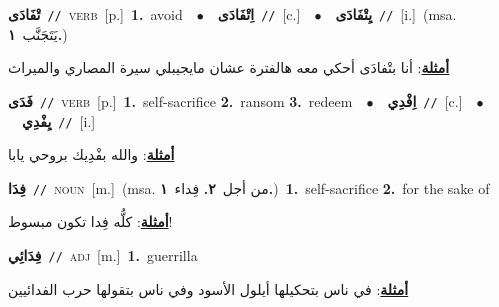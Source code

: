 \documentclass[10pt,a4paper,twoside]{article} %
\begin{document}
\begin{multicols}{2}
{\setlength\topsep{0pt}\textbf{\foreignlanguage{arabic}{تْفَادَى}}\ {\color{gray}\texttt{//}\color{black}}\ \textsc{verb}\ [p.]\ \textbf{1.}~avoid\ \ $\bullet$\ \ \setlength\topsep{0pt}\textbf{\foreignlanguage{arabic}{اِتْفَادَى}}\ {\color{gray}\texttt{//}\color{black}}\ [c.]\ \ $\bullet$\ \ \setlength\topsep{0pt}\textbf{\foreignlanguage{arabic}{يِتْفَادَى}}\ {\color{gray}\texttt{//}\color{black}}\ [i.]\ \color{gray}(msa. \foreignlanguage{arabic}{يَتَجَنَّب}~\foreignlanguage{arabic}{\textbf{١.}})\color{black}\  \begin{flushright}\color{gray}\foreignlanguage{arabic}{\textbf{\underline{\foreignlanguage{arabic}{أمثلة}}}: أنا بتْفادَى أحكي معه هالفترة عشان مايجيبلي سيرة المصاري والميراث}\end{flushright}\color{black}} \vspace{2mm}

{\setlength\topsep{0pt}\textbf{\foreignlanguage{arabic}{فَدَى}}\ {\color{gray}\texttt{//}\color{black}}\ \textsc{verb}\ [p.]\ \textbf{1.}~self-sacrifice  \textbf{2.}~ransom  \textbf{3.}~redeem\ \ $\bullet$\ \ \setlength\topsep{0pt}\textbf{\foreignlanguage{arabic}{اِفْدِي}}\ {\color{gray}\texttt{//}\color{black}}\ [c.]\ \ $\bullet$\ \ \setlength\topsep{0pt}\textbf{\foreignlanguage{arabic}{يِفْدِي}}\ {\color{gray}\texttt{//}\color{black}}\ [i.]\  \begin{flushright}\color{gray}\foreignlanguage{arabic}{\textbf{\underline{\foreignlanguage{arabic}{أمثلة}}}: والله بفْدِيك بروحي يابا}\end{flushright}\color{black}} \vspace{2mm}

{\setlength\topsep{0pt}\textbf{\foreignlanguage{arabic}{فِدَا}}\ {\color{gray}\texttt{//}\color{black}}\ \textsc{noun}\ [m.]\ \color{gray}(msa. \foreignlanguage{arabic}{من أجل}~\foreignlanguage{arabic}{\textbf{٢.}}  \foreignlanguage{arabic}{فِداء}~\foreignlanguage{arabic}{\textbf{١.}})\color{black}\ \textbf{1.}~self-sacrifice  \textbf{2.}~for the sake of\  \begin{flushright}\color{gray}\foreignlanguage{arabic}{\textbf{\underline{\foreignlanguage{arabic}{أمثلة}}}: كلُّه فِدا تكون مبسوط!}\end{flushright}\color{black}} \vspace{2mm}

{\setlength\topsep{0pt}\textbf{\foreignlanguage{arabic}{فِدَائِي}}\ {\color{gray}\texttt{//}\color{black}}\ \textsc{adj}\ [m.]\ \textbf{1.}~guerrilla\  \begin{flushright}\color{gray}\foreignlanguage{arabic}{\textbf{\underline{\foreignlanguage{arabic}{أمثلة}}}: في ناس بتحكيلها أيلول الأسود وفي ناس بتقولها حرب الفدائيين}\end{flushright}\color{black}} \vspace{2mm}


\end{multicols}
\end{document}
